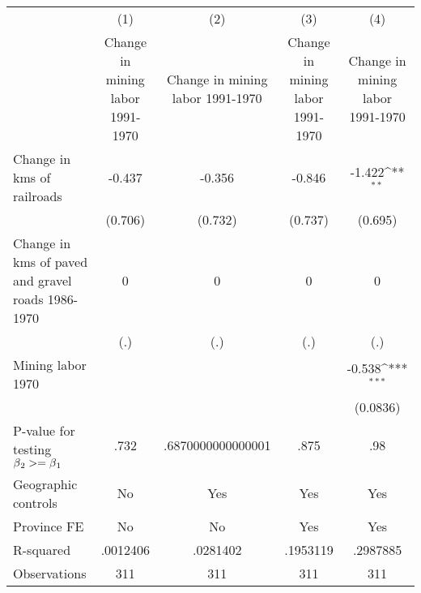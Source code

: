 {
\def\sym#1{\ifmmode^{#1}\else\(^{#1}\)\fi}
\begin{tabular}{l*{4}{c}}
\hline\hline
                &\multicolumn{1}{c}{(1)}&\multicolumn{1}{c}{(2)}&\multicolumn{1}{c}{(3)}&\multicolumn{1}{c}{(4)}\\
                &\multicolumn{1}{c}{Change in mining labor 1991-1970}&\multicolumn{1}{c}{Change in mining labor 1991-1970}&\multicolumn{1}{c}{Change in mining labor 1991-1970}&\multicolumn{1}{c}{Change in mining labor 1991-1970}\\
\hline
Change in kms of railroads&   -0.437         &   -0.356         &   -0.846         &   -1.422\sym{**} \\
                &  (0.706)         &  (0.732)         &  (0.737)         &  (0.695)         \\
[1em]
Change in kms of paved and gravel roads 1986-1970&        0         &        0         &        0         &        0         \\
                &      (.)         &      (.)         &      (.)         &      (.)         \\
[1em]
Mining labor 1970&                  &                  &                  &   -0.538\sym{***}\\
                &                  &                  &                  & (0.0836)         \\
\hline
P-value for testing $\beta\\_2 >= \beta\\_1$&     .732         &.6870000000000001         &     .875         &      .98         \\
Geographic controls&       No         &      Yes         &      Yes         &      Yes         \\
Province FE     &       No         &       No         &      Yes         &      Yes         \\
R-squared       & .0012406         & .0281402         & .1953119         & .2987885         \\
Observations    &      311         &      311         &      311         &      311         \\
\hline\hline
\end{tabular}
}
